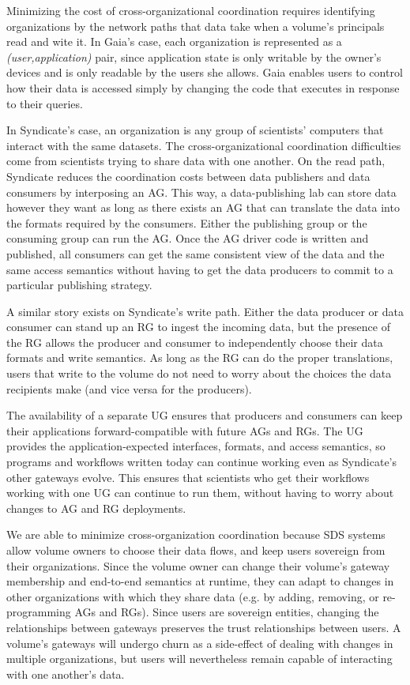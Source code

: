 Minimizing the cost of cross-organizational coordination requires identifying
organizations by the network paths that data take when a volume's principals
read and wite it.  In Gaia's case, each organization is represented as a
\textit{(user,application)} pair, since
application state is only writable by the owner's devices and is only readable
by the users she allows.  Gaia enables users to control how their
data is accessed simply by changing the code that executes in response to their queries.

In Syndicate's case, an organization is any group of scientists' computers
that interact with the same datasets.  The cross-organizational coordination
difficulties come from scientists trying to share data with one another.
On the read path, Syndicate reduces the coordination costs between data publishers and data consumers by
interposing an AG.  This way, a data-publishing lab can store data however
they want as long as there exists an AG that can translate the data into the
formats required by the consumers.  Either the publishing group or the consuming
group can run the AG.  Once the AG driver code is written and published,
all consumers can get the same consistent view of the data and the same access
semantics without having to get the data producers to commit to a particular
publishing strategy.

A similar story exists on Syndicate's write path.  Either the data producer or data
consumer can stand up an RG to ingest the incoming data, but the presence of the
RG allows the producer and consumer to independently choose their data formats
and write semantics.  As long as the RG can do the proper translations, users
that write to the volume do not need to worry about the choices the data
recipients make (and vice versa for the producers).

The availability of a separate UG ensures that producers and consumers can keep
their applications forward-compatible with future AGs and RGs.  The UG provides
the application-expected interfaces, formats, and access semantics, so
programs and workflows written today can continue working even as Syndicate's
other gateways evolve.  This ensures that scientists who get their workflows
working with one UG can continue to run them, without having to worry about
changes to AG and RG deployments.

We are able to minimize cross-organization coordination because SDS systems
allow volume owners to choose their data flows, and keep users sovereign from
their organizations.  Since the volume owner can change their volume's gateway
membership and end-to-end semantics at runtime, they can adapt to changes in
other organizations with which they share data (e.g. by adding, removing, or
re-programming AGs and RGs).  Since users are sovereign entities, changing the
relationships between gateways preserves the trust relationships between users.
A volume's gateways will undergo churn as a side-effect of dealing with changes
in multiple organizations, but users will nevertheless remain capable of
interacting with one another's data.

